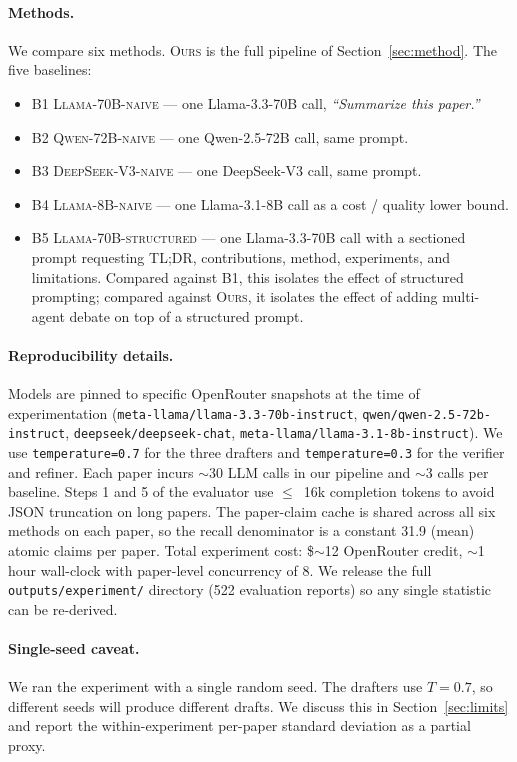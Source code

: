 \documentclass[11pt,a4paper]{article}
\begin{document}
\paragraph{Methods.}
We compare six methods. \textsc{Ours} is the full pipeline of
Section~\ref{sec:method}. The five baselines:
\begin{itemize}[leftmargin=*,topsep=1pt,itemsep=1pt]
    \item \textsc{B1 Llama-70B-naive} --- one Llama-3.3-70B call,
    \textit{``Summarize this paper.''}
    \item \textsc{B2 Qwen-72B-naive} --- one Qwen-2.5-72B call, same prompt.
    \item \textsc{B3 DeepSeek-V3-naive} --- one DeepSeek-V3 call, same prompt.
    \item \textsc{B4 Llama-8B-naive} --- one Llama-3.1-8B call as a
    cost / quality lower bound.
    \item \textsc{B5 Llama-70B-structured} --- one Llama-3.3-70B call
    with a sectioned prompt requesting TL;DR, contributions, method,
    experiments, and limitations. Compared against B1, this isolates
    the effect of structured prompting; compared against \textsc{Ours},
    it isolates the effect of adding multi-agent debate on top of a
    structured prompt.
\end{itemize}

\paragraph{Reproducibility details.}
Models are pinned to specific OpenRouter snapshots at the time of
experimentation
(\texttt{meta-llama/llama-3.3-70b-instruct},
\texttt{qwen/qwen-2.5-72b-instruct},
\texttt{deepseek/deepseek-chat},
\texttt{meta-llama/llama-3.1-8b-instruct}).
We use \texttt{temperature=0.7} for the three drafters and
\texttt{temperature=0.3} for the verifier and refiner. Each paper
incurs $\sim$30 LLM calls in our pipeline and $\sim$3 calls per
baseline. Steps 1 and 5 of the evaluator use $\le$~16k completion
tokens to avoid JSON truncation on long papers. The paper-claim cache
is shared across all six methods on each paper, so the recall
denominator is a constant 31.9 (mean) atomic claims per paper. Total
experiment cost: \$$\sim$12 OpenRouter credit, $\sim$1 hour wall-clock
with paper-level concurrency of 8. We release the full
\texttt{outputs/experiment/} directory (522 evaluation reports) so any
single statistic can be re-derived.

\paragraph{Single-seed caveat.}
We ran the experiment with a single random seed. The drafters use
$T\!=\!0.7$, so different seeds will produce different drafts. We
discuss this in Section~\ref{sec:limits} and report the
within-experiment per-paper standard deviation as a partial proxy.
\end{document}
